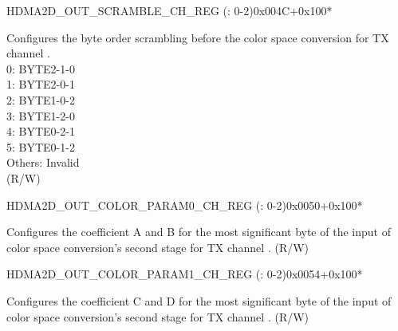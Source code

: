 \begin{register}{H}{DMA2D\_OUT\_SCRAMBLE\_CH\_REG (: 0-2)}{0x004C+0x100*}\label{regdesc:DMA2DOUTSCRAMBLECHNREG}
%
%
\regnewline%
\begin{regdesc}\begin{reglist}
\label{fielddesc:DMA2DOUTSCRAMBLESELPRECHN}\item [DMA2D\_OUT\_SCRAMBLE\_SEL\_PRE\_CH\regindex{n}] Configures the byte order scrambling before the color space conversion for TX channel .\\
0: BYTE2-1-0\\
1: BYTE2-0-1\\
2: BYTE1-0-2\\
3: BYTE1-2-0\\
4: BYTE0-2-1\\
5: BYTE0-1-2\\
Others: Invalid\\ (R/W)
\end{reglist}\end{regdesc}
\end{register}


\begin{register}{H}{DMA2D\_OUT\_COLOR\_PARAM0\_CH\_REG (: 0-2)}{0x0050+0x100*}\label{regdesc:DMA2DOUTCOLORPARAM0CHNREG}
%
%
\regnewline%
\begin{regdesc}\begin{reglist}
\label{fielddesc:DMA2DOUTCOLORPARAMH0CHN}\item [DMA2D\_OUT\_COLOR\_PARAM\_H0\_CH\regindex{n}] Configures the coefficient A and B for the most significant byte of the input of color space conversion's second stage for TX channel . (R/W)
\end{reglist}\end{regdesc}
\end{register}


\begin{register}{H}{DMA2D\_OUT\_COLOR\_PARAM1\_CH\_REG (: 0-2)}{0x0054+0x100*}\label{regdesc:DMA2DOUTCOLORPARAM1CHNREG}
%
%
\regnewline%
\begin{regdesc}\begin{reglist}
\label{fielddesc:DMA2DOUTCOLORPARAMH1CHN}\item [DMA2D\_OUT\_COLOR\_PARAM\_H1\_CH\regindex{n}] Configures the coefficient C and D for the most significant byte of the input of color space conversion's second stage for TX channel . (R/W)
\end{reglist}\end{regdesc}
\end{register}


